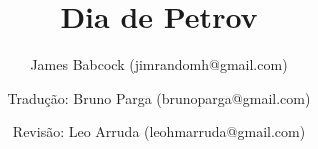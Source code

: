 \documentclass{article}
\begin{document}
\author{James Babcock (jimrandomh@gmail.com)}
\author{Tradu\c{c}\~{a}o: Bruno Parga (brunoparga@gmail.com)}
\author{Revis\~{a}o: Leo Arruda (leohmarruda@gmail.com)}

\title{Dia de Petrov}


%



\end{document}

